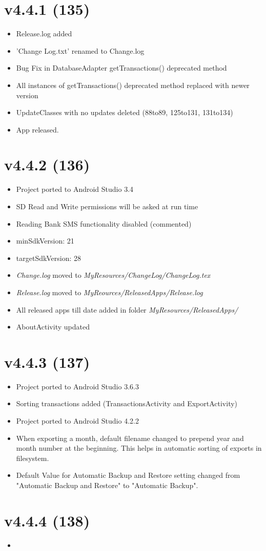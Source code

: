 \documentclass{article}
\begin{document}
    \section{v4.4.1 (135)}\label{sec:135}
    \begin{itemize}
        \item Release.log added
        \item 'Change Log.txt' renamed to Change.log
        \item Bug Fix in DatabaseAdapter getTransactions() deprecated method
        \item All instances of getTransactions() deprecated method replaced with newer version
        \item UpdateClasses with no updates deleted (88to89, 125to131, 131to134)
        \item App released.
    \end{itemize}

    \section{v4.4.2 (136)}\label{sec:136}
    \begin{itemize}
        \item Project ported to Android Studio 3.4
        \item SD Read and Write permissions will be asked at run time
        \item Reading Bank SMS functionality disabled (commented)
        \item minSdkVersion: 21
        \item targetSdkVersion: 28
        \item \textit{Change.log} moved to \textit{MyResources/ChangeLog/ChangeLog.tex}
        \item \textit{Release.log} moved to \textit{MyReources/ReleasedApps/Release.log}
        \item All released apps till date added in folder \textit{MyResources/ReleasedApps/}
        \item AboutActivity updated
    \end{itemize}


    \section{v4.4.3 (137)}\label{sec:137}
    \begin{itemize}
        \item Project ported to Android Studio 3.6.3
        \item Sorting transactions added (TransactionsActivity and ExportActivity)
        \item Project ported to Android Studio 4.2.2
        \item When exporting a month, default filename changed to prepend year and month number at the beginning.
        This helps in automatic sorting of exports in filesystem.
        \item Default Value for Automatic Backup and Restore setting changed from "Automatic Backup and Restore" to "Automatic Backup".
    \end{itemize}


    \section{v4.4.4 (138)}\label{sec:138}
    \begin{itemize}
        \item
    \end{itemize}
\end{document}
